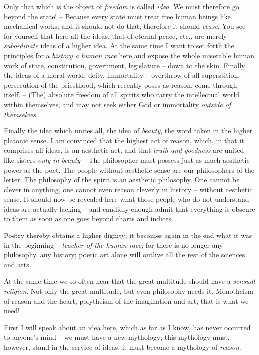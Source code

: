 \documentclass[12pt,letterpaper]{article} %
\begin{document}
Only that which is the object of \textit{freedom} is called \textit{idea}. We must therefore go beyond
the state! -- Because every state must treat free human beings like mechanical works; and it
should not do that; therefore it should \textit{cease}. You see for yourself that here all the ideas, that
of eternal peace, etc., are merely \textit{subordinate} ideas of a higher idea. At the same time I want
to set forth the principles for a \textit{history a human race} here and expose the whole miserable
human work of state, constitution, government, legislature -- down to the skin. Finally the
ideas of a moral world, deity, immortality -- overthrow of all superstition, persecution of the priesthood, which recently poses as reason, come through itself.
-- (The) absolute freedom of all spirits who carry the intellectual world within themselves,
and may not seek either God or immortality \textit{outside of themselves}.

Finally the idea which unites all, the idea of \textit{beauty}, the word
taken in the higher platonic sense. I am convinced that the highest act of reason, which, in
that it comprises all ideas, is an aesthetic act, and that \textit{truth and goodness} are united like
sisters \textit{only in beauty} -- The philosopher must possess just as much aesthetic power as the
poet. The people without aesthetic sense are our philosophers of the letter. The philosophy of 
the spirit is an aesthetic philosophy. One cannot be clever in anything, one cannot even
reason cleverly in history -- without aesthetic sense. It should now be revealed here what
those people who do not understand ideas are actually lacking -- and candidly enough admit
that everything is obscure to them as soon as one goes beyond charts and indices.

Poetry thereby obtains a higher dignity; it becomes again in the end what it was in the
beginning -- \textit{teacher of the human race}; for there is no longer any philosophy,
any history; poetic art alone will outlive all the rest of the sciences and arts.

At the same time we so often hear that the great multitude should have a \textit{sensual
religion}. Not only the great multitude, but even philosophy needs it. Monotheism of reason
and the heart, polytheism of the imagination and art, that is what we need!

First I will speak about an idea here, which as far as I know, has never occurred to
anyone's mind -- we must have a new mythology; this mythology must, however, stand in the
service of ideas, it must become a mythology of \textit{reason}.
\end{document}
